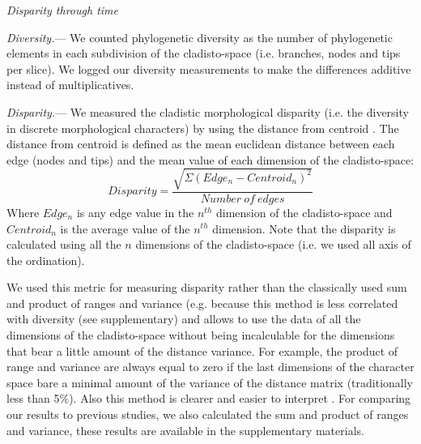 \documentclass[12pt,letterpaper]{article}
\renewcommand{\subsection}[1]{%
\bigskip
\begin{center}
\begin{large}
\normalfont\itshape #1
\end{large}
\end{center}}
\renewcommand{\subsubsection}[1]{%
\vspace{2ex}
\noindent
\textit{#1.}---}
\begin{document}
\subsection{Disparity through time}
\subsubsection{Diversity}
We counted phylogenetic diversity as the number of phylogenetic elements in each subdivision of the cladisto-space (i.e. branches, nodes and tips per slice). We logged our diversity measurements to make the differences additive instead of multiplicatives.

\subsubsection{Disparity}
We measured the cladistic morphological disparity (i.e. the diversity in discrete morphological characters) by using the distance from centroid \cite{finlay2015morphological}. The distance from centroid is defined as the mean euclidean distance between each edge (nodes and tips) and the mean value of each dimension of the cladisto-space:
\begin{equation}
Disparity=\frac{\sqrt{\Sigma(Edge_{n}-Centroid_{n})^2}}{Number\ of\ edges}
\end{equation}
Where $Edge_{n}$ is any edge value in the $n^{th}$ dimension of the cladisto-space and $Centroid_{n}$ is the average value of the $n^{th}$ dimension. Note that the disparity is calculated using all the $n$ dimensions of the cladisto-space (i.e. we used all axis of the ordination).

We used this metric for measuring disparity rather than the classically used sum and product of ranges and variance (e.g. \cite{Wills1994,Foote29111996,Wesley-Hunt2005,Brusatte12092008,ruta2013} %
because this method is less correlated with diversity (see supplementary) and allows to use the data of all the dimensions of the cladisto-space without being incalculable for the dimensions that bear a little amount of the distance variance. For example, the product of range and variance are always equal to zero if the last dimensions of the character space bare a minimal amount of the variance of the distance matrix (traditionally less than 5\%). Also this method is clearer and easier to interpret \cite{finlay2015morphological}. For comparing our results to previous studies, we also calculated the sum and product of ranges and variance, these results are available in the supplementary materials.
\end{document}
